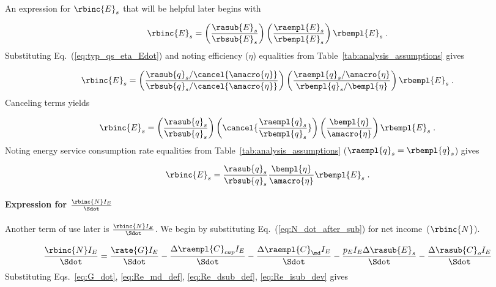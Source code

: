 An expression for $\rbinc{E}_s$ that will be helpful later
begins with

\begin{equation}
  \rbinc{E}_s = \left( \frac{\rasub{E}_s}{\rbsub{E}_s} \right)
                \left( \frac{\raempl{E}_s}{\rbempl{E}_s} \right)
                \rbempl{E}_s \; .
\end{equation}
%
Substituting Eq.~(\ref{eq:typ_qs_eta_Edot}) and noting efficiency ($\eta$)
equalities from Table~\ref{tab:analysis_assumptions} gives

\begin{equation}
  \rbinc{E}_s = \left( \frac{\rasub{q}_s / \cancel{\amacro{\eta}}}{\rbsub{q}_s / \cancel{\amacro{\eta}}} \right)
                \left( \frac{\raempl{q}_s / \amacro{\eta}}{\rbempl{q}_s / \bempl{\eta}} \right)
                \rbempl{E}_s \; .
\end{equation}
%
Canceling terms yields

\begin{equation}
  \rbinc{E}_s = \left( \frac{\rasub{q}_s}{\rbsub{q}_s} \right)
                \left( \cancel{\frac{\raempl{q}_s}{\rbempl{q}_s}} \right)
                \left( \frac{\bempl{\eta}}{\amacro{\eta}}  \right)
                \rbempl{E}_s \; .
\end{equation}
%
Noting energy service consumption rate equalities from Table~\ref{tab:analysis_assumptions} 
($\raempl{q}_s = \rbempl{q}_s$) gives

\begin{equation} \label{eq:E_dot_s_hat}
  \rbinc{E}_s = \frac{\rasub{q}_s}{\rbsub{q}_s}
                \frac{\bempl{\eta}}{\amacro{\eta}}
                \rbempl{E}_s \; .
\end{equation}


\paragraph{Expression for $\frac{\rbinc{N} I_E}{\Sdot}$}
\label{sec:N_dot_hat_I_E_over_Sdot}

Another term of use later is $\frac{\rbinc{N} I_E}{\Sdot}$.
We begin by substituting Eq.~(\ref{eq:N_dot_after_sub}) for net income~($\rbinc{N}$).

\begin{equation}
  \frac{\rbinc{N} I_E}{\Sdot} = \frac{\rate{G} I_E}{\Sdot}
                                - \frac{\Delta \raempl{C}_{cap} I_E}{\Sdot}
                                - \frac{\Delta \raempl{C}_{\md} I_E}{\Sdot}
                                - \frac{p_E I_E \Delta \rasub{E}_s}{\Sdot}
                                - \frac{\Delta \rasub{C}_o I_E}{\Sdot}
\end{equation}
%
Substituting Eqs.~\ref{eq:G_dot}, \ref{eq:Re_md_def}, \ref{eq:Re_dsub_def}, \ref{eq:Re_isub_dev} gives


